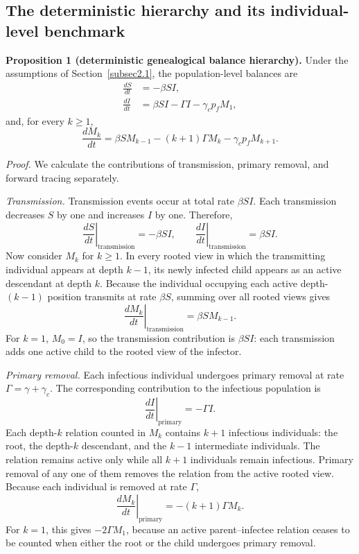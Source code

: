 \documentclass[review,12pt]{elsarticle}
\numberwithin{equation}{section}
\theoremstyle{remark}
\begin{document}
\subsection{The deterministic hierarchy and its individual-level benchmark}\label{subsec2.4}

\textbf{Proposition 1 (deterministic genealogical balance hierarchy).} Under the assumptions of Section~\ref{subsec2.1}, the population-level balances are
\begin{align}
\frac{dS}{dt} &= -\beta S I, \label{eq:2.21a}\\
\frac{dI}{dt} &= \beta S I - \Gamma I - \gamma_c p_f M_1, \label{eq:2.21b}
\end{align}
and, for every $k\geq1$,
\begin{equation}
\frac{dM_k}{dt} = \beta S M_{k-1} - (k+1)\Gamma M_k - \gamma_c p_f M_{k+1}.
\label{eq:2.21c}
\end{equation}

\textit{Proof.} We calculate the contributions of transmission, primary removal, and forward tracing separately.

\textit{Transmission.} Transmission events occur at total rate $\beta S I$. Each transmission decreases $S$ by one and increases $I$ by one. Therefore,
\[
\left.\frac{dS}{dt}\right|_{\text{transmission}} = -\beta S I, \qquad \left.\frac{dI}{dt}\right|_{\text{transmission}} = \beta S I.
\]
Now consider $M_k$ for $k\geq1$. In every rooted view in which the transmitting individual appears at depth $k-1$, its newly infected child appears as an active descendant at depth $k$. Because the individual occupying each active depth-$(k-1)$ position transmits at rate $\beta S$, summing over all rooted views gives
\begin{equation}
\left.\frac{dM_k}{dt}\right|_{\text{transmission}} = \beta S M_{k-1}.
\label{eq:2.22}
\end{equation}
For $k=1$, $M_0=I$, so the transmission contribution is $\beta S I$: each transmission adds one active child to the rooted view of the infector.

\textit{Primary removal.} Each infectious individual undergoes primary removal at rate $\Gamma=\gamma+\gamma_c$. The corresponding contribution to the infectious population is
\[
\left.\frac{dI}{dt}\right|_{\text{primary}} = -\Gamma I.
\]
Each depth-$k$ relation counted in $M_k$ contains $k+1$ infectious individuals: the root, the depth-$k$ descendant, and the $k-1$ intermediate individuals. The relation remains active only while all $k+1$ individuals remain infectious. Primary removal of any one of them removes the relation from the active rooted view. Because each individual is removed at rate $\Gamma$,
\begin{equation}
\left.\frac{dM_k}{dt}\right|_{\text{primary}} = -(k+1)\Gamma M_k.
\label{eq:2.23}
\end{equation}
For $k=1$, this gives $-2\Gamma M_1$, because an active parent--infectee relation ceases to be counted when either the root or the child undergoes primary removal.
\end{document}
